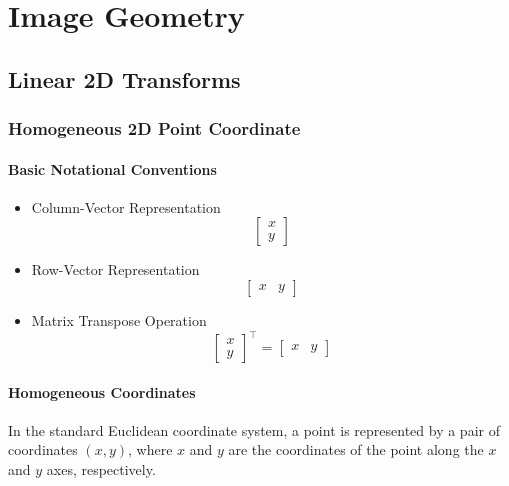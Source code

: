 \chapter{Image Geometry}

\section{Linear 2D Transforms}

\subsection{Homogeneous 2D Point Coordinate}

\subsubsection{Basic Notational Conventions}

\begin{itemize}
    \item Column-Vector Representation \[
        \begin{bmatrix}
            x \\
            y 
        \end{bmatrix}
    \]

    \item Row-Vector Representation \[
        \begin{bmatrix}
            x & y
        \end{bmatrix}
    \]

    \item Matrix Transpose Operation \[
        \begin{bmatrix}
            x \\
            y
        \end{bmatrix}^\top = \begin{bmatrix}
            x & y
        \end{bmatrix}
    \]
\end{itemize}

\subsubsection{Homogeneous Coordinates}

In the standard Euclidean coordinate system, a point is represented by a pair of coordinates $(x, y)$, where $x$ and $y$ are the coordinates of the point along the $x$ and $y$ axes, respectively. 

